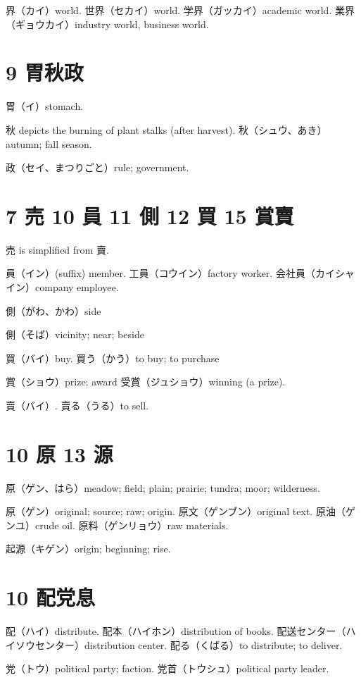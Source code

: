 界（カイ）world.
世界（セカイ）world.
学界（ガッカイ）academic world.
業界（ギョウカイ）industry world, business world.

\section{9 胃秋政}

胃（イ）stomach.

秋 depicts the burning of plant stalks (after harvest).
秋（シュウ、あき）autumn; fall season.

政（セイ、まつりごと）rule; government.

\section{7 売 10 員 11 側 12 買 15 賞賣}

売 is simplified from 賣.

員（イン）(suffix) member.
工員（コウイン）factory worker.
会社員（カイシャイン）company employee.

側（がわ、かわ）side

側（そば）vicinity; near; beside

買（バイ）buy.
買う（かう）to buy; to purchase

賞（ショウ）prize; award
受賞（ジュショウ）winning (a prize).

賣（バイ）.
賣る（うる）to sell.

\section{10 原 13 源}

原（ゲン、はら）meadow; field; plain; prairie; tundra; moor; wilderness.

原（ゲン）original; source; raw; origin.
原文（ゲンブン）original text.
原油（ゲンユ）crude oil.
原料（ゲンリョウ）raw materials.

起源（キゲン）origin; beginning; rise.

\section{10 配党息}

配（ハイ）distribute.
配本（ハイホン）distribution of books.
配送センター（ハイソウセンター）distribution center.
配る（くばる）to distribute; to deliver.

党（トウ）political party; faction.
党首（トウシュ）political party leader.


